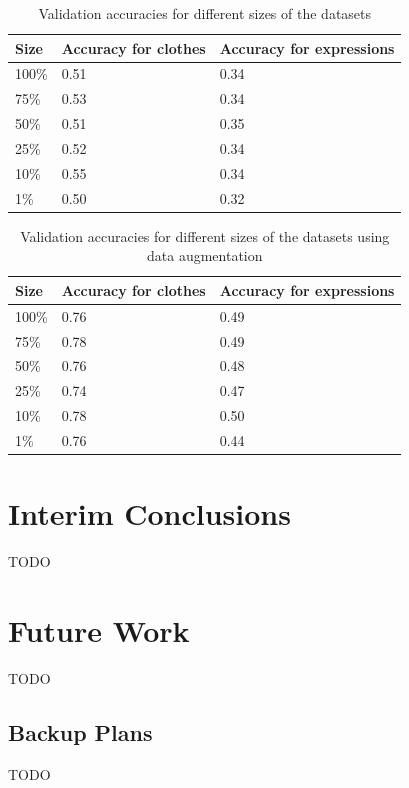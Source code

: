 \documentclass{article}
\begin{document}
\begin{table}[!htb]
  \centering
  \begin{tabular}{| l | l | l |}
    \hline
    \textbf{Size} & \textbf{Accuracy for clothes} & \textbf{Accuracy for expressions}\\ \hline
    100\% & 0.51 & 0.34\\ \hline
    75\% & 0.53  & 0.34\\ \hline
    50\% & 0.51 & 0.35\\ \hline
	25\% & 0.52 & 0.34\\ \hline
	10\% & 0.55 & 0.34\\ \hline
	1\% & 0.50 & 0.32\\ \hline

  \end{tabular}
  \caption{Validation accuracies for different sizes of the datasets}
  \label{tab:2}
\end{table}

\begin{table}[!htb]
  \centering
  \begin{tabular}{| l | l | l |}
    \hline
    \textbf{Size} & \textbf{Accuracy for clothes} & \textbf{Accuracy for expressions}\\ \hline
    100\% & 0.76 & 0.49\\ \hline
    75\% & 0.78  & 0.49\\ \hline
    50\% & 0.76 & 0.48\\ \hline
	25\% & 0.74 & 0.47\\ \hline
	10\% & 0.78 & 0.50\\ \hline
	1\% & 0.76 & 0.44\\ \hline

  \end{tabular}
  \caption{Validation accuracies for different sizes of the datasets using data augmentation}
  \label{tab:3}
\end{table}


\section{Interim Conclusions}
\label{sec:conclusions}

TODO

\section{Future Work}
\label{sec:future}

TODO

\subsection{Backup Plans}
\label{sec:plans}

TODO




\end{document}
